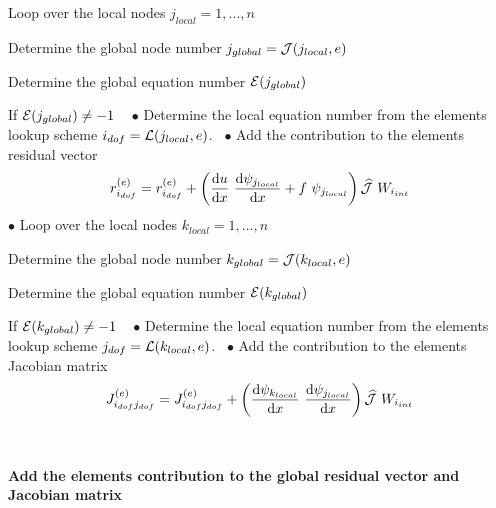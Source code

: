 \begin{DoxyItemize}
\begin{DoxyItemize}
\item Loop over the local nodes $ j_{local}=1,...,n $
\begin{DoxyItemize}
\item Determine the global node number $ j_{global}={\cal J}(j_{local},e)$
\item Determine the global equation number $ {\cal E}( j_{global}) $
\item If $ {\cal E}( j_{global}) \ne -1 $ ~\newline
 $ \bullet $ Determine the local equation number from the element\textquotesingle{}s lookup scheme $ i_{dof}= {\cal L}(j_{local},e)$.~\newline
 $ \bullet $ Add the contribution to the element\textquotesingle{}s residual vector \[ r_{i_{dof}}^{(e)} = r_{i_{dof}}^{(e)} + \left( \frac{\mbox{d} u}{\mbox{d} x} \ \frac{\mbox{d} \psi_{j_{local}}}{\mbox{d} x} + f \ \psi_{j_{local}} \right) \widehat{\cal J}\ W_{i_{int}} \] $ \bullet $ Loop over the local nodes $ k_{local}=1,...,n$
\begin{DoxyItemize}
\item Determine the global node number $ k_{global}={\cal J}(k_{local},e)$
\item Determine the global equation number $ {\cal E}( k_{global}) $
\item If $ {\cal E}( k_{global}) \ne -1 $ ~\newline
 $ \bullet $ Determine the local equation number from the element\textquotesingle{}s lookup scheme $ j_{dof}= {\cal L}(k_{local},e)$.~\newline
 $ \bullet $ Add the contribution to the element\textquotesingle{}s Jacobian matrix \[ J_{i_{dof}j_{dof}}^{(e)} = J_{i_{dof}j_{dof}}^{(e)} + \left( \frac{\mbox{d} \psi_{k_{local}}}{\mbox{d} x} \ \frac{\mbox{d} \psi_{j_{local}}}{\mbox{d} x} \right) \widehat{\cal J} \ W_{i_{int}} \]
\end{DoxyItemize}
\end{DoxyItemize}~\newline
 ~\newline
 \begin{center} {\bfseries  Add the element\textquotesingle{}s contribution to the global residual vector and Jacobian matrix } \end{center}  ~\newline


\end{DoxyItemize}
\end{DoxyItemize}
